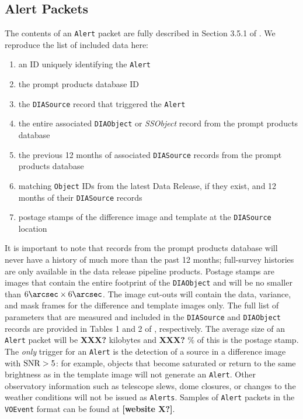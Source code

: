 \subsection{Alert Packets}\label{ssec:packets}

The contents of an {\tt Alert} packet are fully described in Section 3.5.1 of . We reproduce the list of included data here:
\renewcommand{\labelenumi}{\Roman{enumi}.}
\begin{enumerate}
\item an ID uniquely identifying the {\tt Alert}
\item the prompt products database ID
\item the {\tt DIASource} record that triggered the {\tt Alert}
\item the entire associated {\tt DIAObject} or {\it SSObject} record from the prompt products database
\item the previous 12 months of associated {\tt DIASource} records from the prompt products database
\item matching {\tt Object} IDs from the latest Data Release, if they exist, and 12 months of their {\tt DIASource} records
\item postage stamps of the difference image and template at the {\tt DIASource} location
\end{enumerate}

It is important to note that records from the prompt products database will never have a history of much more than the past 12 months; full-survey histories are only available in the data release pipeline products. Postage stamps are images that contain the entire footprint of the {\tt DIAObject} and will be no smaller than $6\arcsec \times 6\arcsec$. The image cut-outs will contain the data, variance, and mask frames for the difference and template images only. The full list of parameters that are measured and included in the {\tt DIASource} and {\tt DIAObject} records are provided in Tables 1 and 2 of , respectively. The average size of an {\tt Alert} packet will be {\bf XXX?} kilobytes and {\bf XXX?} \% of this is the postage stamp. The {\em only} trigger for an {\tt Alert} is the detection of a source in a difference image with ${\rm SNR} > 5$: for example, objects that become saturated or return to the same brightness as in the template image will not generate an {\tt Alert}. Other observatory information such as telescope slews, dome closures, or changes to the weather conditions will not be issued as {\tt Alerts}. Samples of {\tt Alert} packets in the {\tt VOEvent} format can be found at {\bf [website X?]}.

